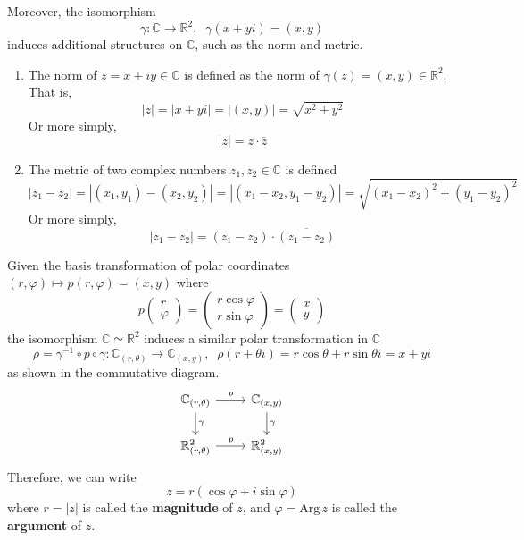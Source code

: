   \begin{definition}
    Moreover, the isomorphism
    \[\gamma: \mathbb{C} \longrightarrow \mathbb{R}^2, \;\; \gamma(x + yi) = (x, y)\]
    induces additional structures on $\mathbb{C}$, such as the norm and metric. 
    \begin{enumerate}
      \item The norm of $z = x + iy \in \mathbb{C}$ is defined as the norm of $\gamma(z) = (x, y) \in \mathbb{R}^2$. That is, 
      \[|z| = |x + yi| = |(x, y)| = \sqrt{x^2 + y^2}\]
      Or more simply, 
      \[|z| = z \cdot \overline{z}\]
      \item The metric of two complex numbers $z_1, z_2 \in \mathbb{C}$ is defined
      \[|z_1 - z_2| = |(x_1, y_1) - (x_2, y_2)| = |(x_1 - x_2, y_1 - y_2)| = \sqrt{(x_1 - x_2)^2 + (y_1 - y_2)^2}\]
      Or more simply, 
      \[|z_1 - z_2| = (z_1 - z_2) \cdot \overline{(z_1 - z_2)}\]
    \end{enumerate}
  \end{definition}

  \begin{definition}
    Given the basis transformation of polar coordinates $(r, \varphi) \mapsto p(r, \varphi) = (x, y)$ where 
    \[p\begin{pmatrix} r \\ \varphi \end{pmatrix} = \begin{pmatrix}
    r \cos{\varphi} \\ r \sin{\varphi} 
    \end{pmatrix} = \begin{pmatrix} x \\ y \end{pmatrix}\]
    the isomorphism $\mathbb{C} \simeq \mathbb{R}^2$ induces a similar polar transformation in $\mathbb{C}$
    \[\rho = \gamma^{-1} \circ p \circ \gamma: \mathbb{C}_{(r, \theta)} \longrightarrow \mathbb{C}_{(x, y)}, \;\;\rho(r + \theta i) = r \cos{\theta} + r \sin{\theta} i = x + y i\]
    as shown in the commutative diagram. 
    \[\begin{tikzcd}
        \mathbb{C}_{(r, \theta)} \arrow{d}{\gamma} \arrow{r}{\rho} & \mathbb{C}_{(x, y)} \arrow{d}{\gamma} \\
        \mathbb{R}^2_{(r, \theta)} \arrow{r}{p} & \mathbb{R}^2_{(x, y)}
      \end{tikzcd}\]
    Therefore, we can write 
    \[z = r ( \cos{\varphi} + i \sin{\varphi})\]
    where $r = |z|$ is called the \textbf{magnitude} of $z$, and $\varphi = \text{Arg}\,z$ is called the \textbf{argument} of $z$. 
  \end{definition}

